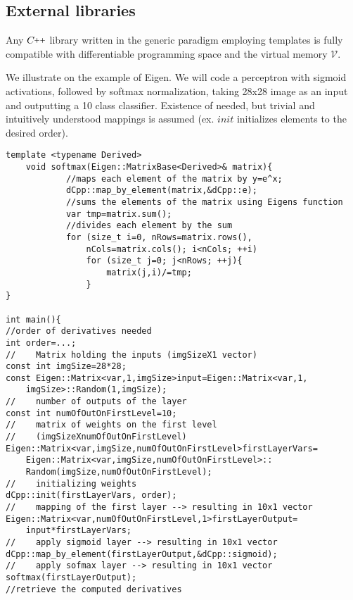 \documentclass{article}
\newcommand{\VV}{\mathcal{V}}
\newcommand{\CC}{C\nolinebreak\hspace{-.05em}\raisebox{.4ex}{\tiny\bf +}\nolinebreak\hspace{-.10em}\raisebox{.4ex}{\tiny\bf +}}
\def\CC{{C\nolinebreak[4]\hspace{-.05em}\raisebox{.4ex}{\tiny\bf ++}}}
\begin{document}
\subsection{External libraries}

Any $\CC$ library written in the generic paradigm employing templates is fully compatible with differentiable programming space and the virtual memory $\VV$. 

We illustrate on the example of Eigen. We will code a perceptron with sigmoid activations, followed by softmax normalization, taking 28x28 image as an input and outputting a 10 class classifier. Existence of needed, but trivial and intuitively understood mappings is assumed (ex. $init$ initializes elements to the desired order). 

\begin{lstlisting}
template <typename Derived>
    void softmax(Eigen::MatrixBase<Derived>& matrix){
            //maps each element of the matrix by y=e^x;
            dCpp::map_by_element(matrix,&dCpp::e);
            //sums the elements of the matrix using Eigens function
            var tmp=matrix.sum();
            //divides each element by the sum
            for (size_t i=0, nRows=matrix.rows(), 
            	nCols=matrix.cols(); i<nCols; ++i)
                for (size_t j=0; j<nRows; ++j){
                    matrix(j,i)/=tmp;
                }
}

int main(){
//order of derivatives needed
int order=...;
//    Matrix holding the inputs (imgSizeX1 vector)
const int imgSize=28*28;
const Eigen::Matrix<var,1,imgSize>input=Eigen::Matrix<var,1,
	imgSize>::Random(1,imgSize);
//    number of outputs of the layer
const int numOfOutOnFirstLevel=10;
//    matrix of weights on the first level 
//    (imgSizeXnumOfOutOnFirstLevel)
Eigen::Matrix<var,imgSize,numOfOutOnFirstLevel>firstLayerVars=
	Eigen::Matrix<var,imgSize,numOfOutOnFirstLevel>::
	Random(imgSize,numOfOutOnFirstLevel);
//    initializing weights
dCpp::init(firstLayerVars, order);
//    mapping of the first layer --> resulting in 10x1 vector
Eigen::Matrix<var,numOfOutOnFirstLevel,1>firstLayerOutput=
	input*firstLayerVars;
//    apply sigmoid layer --> resulting in 10x1 vector
dCpp::map_by_element(firstLayerOutput,&dCpp::sigmoid);
//    apply sofmax layer --> resulting in 10x1 vector
softmax(firstLayerOutput);
//retrieve the computed derivatives
\end{lstlisting}

  \printbibliography
  
\end{document}
